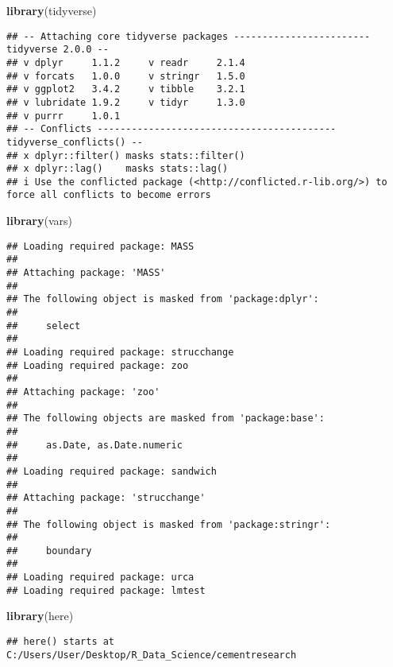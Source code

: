 \documentclass[
]{article}
\author{}
\date{\vspace{-2.5em}}
\newenvironment{Shaded}{\begin{snugshade}}{\end{snugshade}}
\newcommand{\FunctionTok}[1]{\textcolor[rgb]{0.13,0.29,0.53}{\textbf{#1}}}
\newcommand{\NormalTok}[1]{#1}
\begin{document}
\begin{Shaded}
\begin{Highlighting}[]
\FunctionTok{library}\NormalTok{(tidyverse)}
\end{Highlighting}
\end{Shaded}

\begin{verbatim}
## -- Attaching core tidyverse packages ------------------------ tidyverse 2.0.0 --
## v dplyr     1.1.2     v readr     2.1.4
## v forcats   1.0.0     v stringr   1.5.0
## v ggplot2   3.4.2     v tibble    3.2.1
## v lubridate 1.9.2     v tidyr     1.3.0
## v purrr     1.0.1     
## -- Conflicts ------------------------------------------ tidyverse_conflicts() --
## x dplyr::filter() masks stats::filter()
## x dplyr::lag()    masks stats::lag()
## i Use the conflicted package (<http://conflicted.r-lib.org/>) to force all conflicts to become errors
\end{verbatim}

\begin{Shaded}
\begin{Highlighting}[]
\FunctionTok{library}\NormalTok{(vars)}
\end{Highlighting}
\end{Shaded}

\begin{verbatim}
## Loading required package: MASS
## 
## Attaching package: 'MASS'
## 
## The following object is masked from 'package:dplyr':
## 
##     select
## 
## Loading required package: strucchange
## Loading required package: zoo
## 
## Attaching package: 'zoo'
## 
## The following objects are masked from 'package:base':
## 
##     as.Date, as.Date.numeric
## 
## Loading required package: sandwich
## 
## Attaching package: 'strucchange'
## 
## The following object is masked from 'package:stringr':
## 
##     boundary
## 
## Loading required package: urca
## Loading required package: lmtest
\end{verbatim}

\begin{Shaded}
\begin{Highlighting}[]
\FunctionTok{library}\NormalTok{(here)}
\end{Highlighting}
\end{Shaded}

\begin{verbatim}
## here() starts at C:/Users/User/Desktop/R_Data_Science/cementresearch
\end{verbatim}
\end{document}
